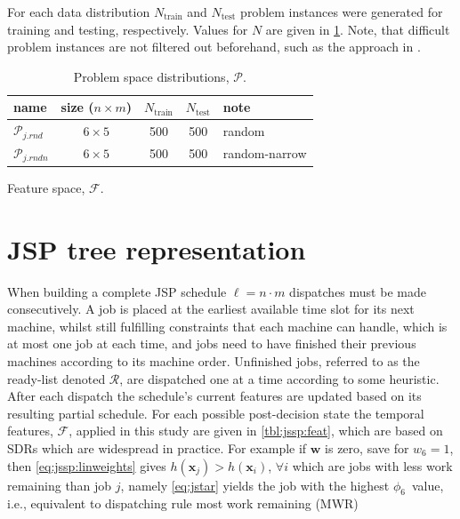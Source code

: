 \documentclass[smallextended]{llncs}
\renewcommand{\vec}[1]{\mathbf{#1}}
\newcommand{\phiwrmJob}{$\phi_6$}
\begin{document}
For each data distribution $N_{\text{train}}$  and $N_{\text{test}}$ problem instances were generated for training and testing, respectively. Values for $N$ are given in \cref{tbl:data:sim}. Note, that difficult problem instances are not filtered out beforehand, such as the approach in \cite{Whitley}. 

\begin{table}\centering
\caption{Problem space distributions, $\mathcal{P}$. }\label{tbl:data:sim}
{\renewcommand{\arraystretch}{1.2}\footnotesize
\begin{tabular}{lcccl}\toprule
name&size ($n\times m$)& $N_{\text{train}}$&$N_{\text{test}}$  & note 
\\ \midrule
$\mathcal{P}_{j.rnd}$ & $6\times5$ & 500 & 500 & random \\
$\mathcal{P}_{j.rndn}$ & $6\times5$ & 500 & 500 & random-narrow \\
\bottomrule
\end{tabular}
}
\end{table}

\begin{table}  \centering
  \caption{Feature space, $\mathcal{F}$.}
  \label{tbl:jssp:feat}
  
\end{table}

\section{JSP tree representation}\label{sec:gametree}
When building a complete JSP schedule $\ell=n\cdot m$ dispatches must be made consecutively. 
A job is placed at the earliest available time slot for its next machine, whilst still fulfilling constraints that each machine can handle, which is at most one job at each time, and jobs need to have finished their previous machines according to its machine order. 
Unfinished jobs, referred to as the ready-list denoted $\mathcal{R}$, are dispatched one at a time according to some heuristic. After each dispatch the schedule's current features are updated based on its resulting partial schedule. 
For each possible post-decision state the temporal features, $\mathcal{F}$, applied in this study are given in \cref{tbl:jssp:feat}, which are based on SDRs which are widespread in practice. For example if $\vec{w}$ is zero, save for $w_6=1$, then \cref{eq:jssp:linweights} gives $h(\vec{x}_j)>h(\vec{x}_i)$, 
$\forall i$ which are jobs with less work remaining than job $j$, namely \cref{eq:jstar} yields the job with the highest \phiwrmJob\ value, 
i.e., equivalent to dispatching rule most work remaining (MWR) 
\end{document}
